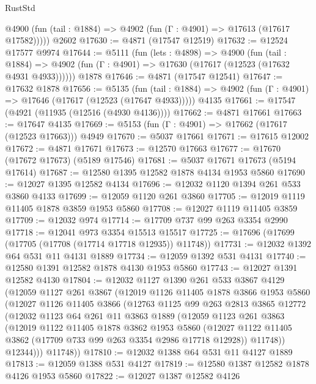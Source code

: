 \begin{lexlean}{RustStd}
\begin{coremodule}
      @4900 (fun (tail : @1884) => @4902 (fun (Γ : @4901) => @17613 (@17617 @17582)))))
    @2602
@17630 := @4871 (@17547 @12519)
@17632 := @12524 @17577 @9974
@17644 := @5111
    (fun (lets : @4898) =>
    @4900
      (fun (tail : @1884) =>
      @4902 (fun (Γ : @4901) => @17630 (@17617 (@12523 (@17632 @4931 @4933))))))
    @1878
@17646 := @4871 (@17547 @12541)
@17647 := @17632 @1878
@17656 := @5135
    (fun (tail : @1884) => @4902 (fun (Γ : @4901) => @17646 (@17617 (@12523 (@17647 @4933)))))
    @4135
@17661 := @17547 (@4921 (@11935 (@12516 (@4930 @4136))))
@17662 := @4871 @17661
@17663 := @17647 @4135
@17669 := @5153 (fun (Γ : @4901) => @17662 (@17617 (@12523 @17663))) @4949
@17670 := @5037 @17661
@17671 := @17615 @12002
@17672 := @4871 @17671
@17673 := @12570 @17663
@17677 := @17670 (@17672 @17673) (@5189 @17546)
@17681 := @5037 @17671 @17673 (@5194 @17614)
@17687 := @12580 @1395 @12582 @1878 @4134 @1953 @5860
@17690 := @12027 @1395 @12582 @4134
@17696 := @12032 @1120 @1394 @261 @533 @3860 @4133
@17699 := @12059 @1120 @261 @3860
@17705 := @12019 @1119 @11405 @1878 @3859 @1953 @5860
@17708 := @12027 @1119 @11405 @3859
@17709 := @12032 @974
@17714 := @17709 @737 @99 @263 @3354 @2990
@17718 := @12041 @973 @3354 @15513 @15517
@17725 := @17696 (@17699 (@17705 (@17708 (@17714 @17718 @12935)) @11748))
@17731 := @12032 @1392 @64 @531 @11 @4131 @1889
@17734 := @12059 @1392 @531 @4131
@17740 := @12580 @1391 @12582 @1878 @4130 @1953 @5860
@17743 := @12027 @1391 @12582 @4130
@17804 := @12032
    @1127
    @1390
    @261
    @533
    @3867
    @4129
    (@12059
      @1127
      @261
      @3867
      (@12019
        @1126
        @11405
        @1878
        @3866
        @1953
        @5860
        (@12027
          @1126
          @11405
          @3866
          (@12763
            @1125
            @99
            @263
            @2813
            @3865
            @12772
            (@12032
              @1123
              @64
              @261
              @11
              @3863
              @1889
              (@12059
                @1123
                @261
                @3863
                (@12019
                  @1122
                  @11405
                  @1878
                  @3862
                  @1953
                  @5860
                  (@12027 @1122 @11405 @3862 (@17709 @733 @99 @263 @3354 @2986 @17718 @12928))
                  @11748))
              @12344)))
        @11748))
@17810 := @12032 @1388 @64 @531 @11 @4127 @1889
@17813 := @12059 @1388 @531 @4127
@17819 := @12580 @1387 @12582 @1878 @4126 @1953 @5860
@17822 := @12027 @1387 @12582 @4126

\end{coremodule}
\end{lexlean}
